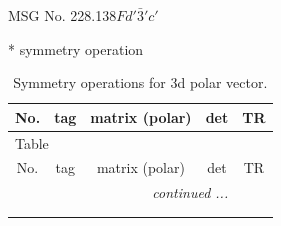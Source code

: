 \documentclass[fleqn,8pt]{jsarticle}
\begin{document}
\setcounter{MaxMatrixCols}{32}

\renewcommand{\tablename}{Table~}
\renewcommand{\figurename}{Figure~}
\begin{center}
\LARGE
MSG No. 228.138\quad$Fd'\bar{3}'c'$
\end{center}
* symmetry operation
\renewcommand{\arraystretch}{1.3}
\begin{longtable}{ccccc}
\caption{Symmetry operations for 3d polar vector.}
 \\
 \hline \hline
No. & tag & matrix (polar) & det & TR \\ \hline \endfirsthead

\multicolumn{4}{l}{\tablename\ \thetable{}} \\
 \hline \hline
No. & tag & matrix (polar) & det & TR \\ \hline \endhead

 \hline \hline
\multicolumn{4}{r}{\footnotesize\it continued ...} \\ \endfoot

 \hline \hline
\multicolumn{4}{r}{} \\ \endlastfoot


\end{longtable}
\end{document}
